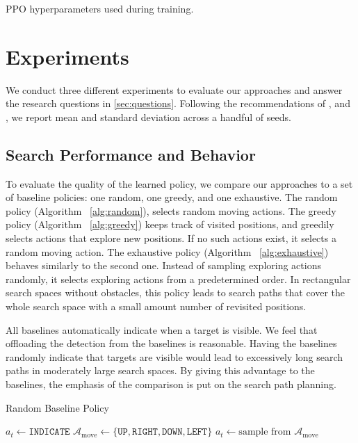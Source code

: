 \begin{table}
    \centering
    \caption[PPO hyperparameters]{PPO hyperparameters used during training.}
    
    \label{tab:hyperparameters}
\end{table}

\section{Experiments}
\label{sec:experiments}

We conduct three different experiments to evaluate our approaches and answer the research questions in \ref{sec:questions}. 
Following the recommendations of \cite{henderson_deep_2018}, \cite{colas_hitchhikers_2019} and \cite{agarwal_deep_2022}, we report mean and standard deviation across a handful of seeds.

\subsection{Search Performance and Behavior}

To evaluate the quality of the learned policy, we compare our approaches to a set of baseline policies: one random, one greedy, and one exhaustive.
The random policy (Algorithm ~\ref{alg:random}), selects random moving actions.
The greedy policy (Algorithm ~\ref{alg:greedy}) keeps track of visited positions, and greedily selects actions that explore new positions.
If no such actions exist, it selects a random moving action.
The exhaustive policy (Algorithm ~\ref{alg:exhaustive}) behaves similarly to the second one.
Instead of sampling exploring actions randomly, it selects exploring actions from a predetermined order.
In rectangular search spaces without obstacles, this policy leads to search paths that cover the whole search space with a small amount number of revisited positions.

All baselines automatically indicate when a target is visible.
We feel that offloading the detection from the baselines is reasonable.
Having the baselines randomly indicate that targets are visible would lead to excessively long search paths in moderately large search spaces.
By giving this advantage to the baselines, the emphasis of the comparison is put on the search path planning.

\begin{algorithm}
    \caption{Random Baseline Policy}
    \label{alg:random}
    \begin{algorithmic}
            \State \(a_t \leftarrow \mathtt{INDICATE}\)
        \Else
            \State \(\mathcal{A}_{\text{move}} \leftarrow \{\mathtt{UP}, \mathtt{RIGHT}, \mathtt{DOWN}, \mathtt{LEFT}\}\)
            \State \(a_t \leftarrow \text{sample from } \mathcal{A}_{\text{move}}\)
        \EndIf
    \end{algorithmic}
\end{algorithm}

